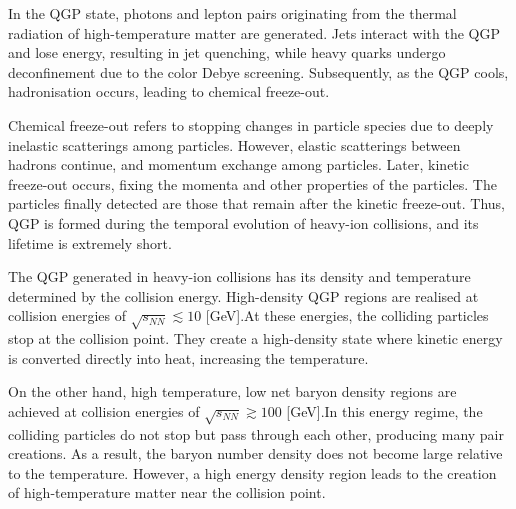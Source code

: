         In the QGP state, photons and lepton pairs originating from the thermal radiation of high-temperature matter are generated. Jets interact with the QGP and lose energy, resulting in jet quenching, while heavy quarks undergo deconfinement due to the color Debye screening. Subsequently, as the QGP cools, hadronisation occurs, leading to chemical freeze-out.  
               
        Chemical freeze-out refers to stopping changes in particle species due to deeply inelastic scatterings among particles. However, elastic scatterings between hadrons continue, and momentum exchange among particles. Later, kinetic freeze-out occurs, fixing the momenta and other properties of the particles. The particles finally detected are those that remain after the kinetic freeze-out. Thus, QGP is formed during the temporal evolution of heavy-ion collisions, and its lifetime is extremely short.
        
        
        The QGP generated in heavy-ion collisions has its density and temperature determined by the collision energy. High-density QGP regions are realised at collision energies of $\sqrt{s_{NN}} \lesssim 10$ [GeV].\@ At these energies, the colliding particles stop at the collision point. They create a high-density state where kinetic energy is converted directly into heat, increasing the temperature.  
  
        On the other hand, high temperature, low net baryon density regions are achieved at collision energies of $\sqrt{s_{NN}} \gtrsim 100$ [GeV].\@ In this energy regime, the colliding particles do not stop but pass through each other, producing many pair creations. As a result, the baryon number density does not become large relative to the temperature. However, a high energy density region leads to the creation of high-temperature matter near the collision point.  
               

